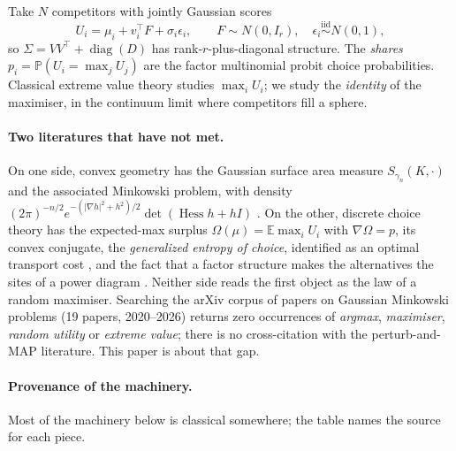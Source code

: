 \documentclass[11pt]{article}
\theoremstyle{definition}
\DeclareMathOperator{\Hess}{Hess}
\newcommand{\E}{\mathbb{E}}
\newcommand{\Prob}{\mathbb{P}}
\begin{document}
Take $N$ competitors with jointly Gaussian scores
\begin{equation}\label{eq:race}
  U_{i}=\mu_{i}+v_{i}^{\top}F+\sigma_{i}\epsilon_{i},
  \qquad F\sim N(0,I_{r}),\quad \epsilon_{i}\stackrel{\text{iid}}{\sim}N(0,1),
\end{equation}
so $\Sigma=VV^{\top}+\operatorname{diag}(D)$ has rank-$r$-plus-diagonal
structure. The \emph{shares} $p_{i}=\Prob(U_{i}=\max_{j}U_{j})$ are the factor
multinomial probit choice probabilities. Classical extreme value theory studies
$\max_{i}U_{i}$; we study the \emph{identity} of the maximiser, in the
continuum limit where competitors fill a sphere.

\paragraph{Two literatures that have not met.}
On one side, convex geometry has the Gaussian surface area measure
$S_{\gamma_{n}}(K,\cdot)$ and the associated Minkowski problem, with density
$(2\pi)^{-n/2}e^{-(\lvert\nabla h\rvert^{2}+h^{2})/2}\det(\Hess h+hI)$
\cite{HXZ,LiuLp}. On the other, discrete choice theory has the expected-max
surplus $\Omega(\mu)=\E\max_{i}U_{i}$ with $\nabla\Omega=p$, its convex
conjugate, the \emph{generalized entropy of choice}, identified as an
optimal transport cost \cite{GS,CGS}, and the fact that a factor structure
makes the alternatives the sites of a power diagram \cite{GS}. Neither side
reads the first object as the law of a random maximiser. Searching the arXiv
corpus of papers on Gaussian Minkowski problems (19 papers, 2020--2026) returns
zero occurrences of \emph{argmax}, \emph{maximiser}, \emph{random utility} or
\emph{extreme value}; there is no cross-citation with the perturb-and-MAP
literature. This paper is about that gap.

\paragraph{Provenance of the machinery.}
Most of the machinery below is classical somewhere; the table names the
source for each piece.
\end{document}
